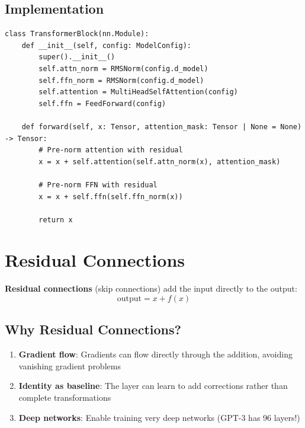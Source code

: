 \subsection{Implementation}

\begin{lstlisting}[style=python, caption={TransformerBlock with pre-norm from model.py}]
class TransformerBlock(nn.Module):
    def __init__(self, config: ModelConfig):
        super().__init__()
        self.attn_norm = RMSNorm(config.d_model)
        self.ffn_norm = RMSNorm(config.d_model)
        self.attention = MultiHeadSelfAttention(config)
        self.ffn = FeedForward(config)

    def forward(self, x: Tensor, attention_mask: Tensor | None = None) -> Tensor:
        # Pre-norm attention with residual
        x = x + self.attention(self.attn_norm(x), attention_mask)

        # Pre-norm FFN with residual
        x = x + self.ffn(self.ffn_norm(x))

        return x
\end{lstlisting}

\section{Residual Connections}

\textbf{Residual connections} (skip connections) add the input directly to the output:
\begin{equation}
\text{output} = x + f(x)
\end{equation}

\subsection{Why Residual Connections?}

\begin{enumerate}
    \item \textbf{Gradient flow}: Gradients can flow directly through the addition, avoiding vanishing gradient problems
    \item \textbf{Identity as baseline}: The layer can learn to add corrections rather than complete transformations
    \item \textbf{Deep networks}: Enable training very deep networks (GPT-3 has 96 layers!)
\end{enumerate}

